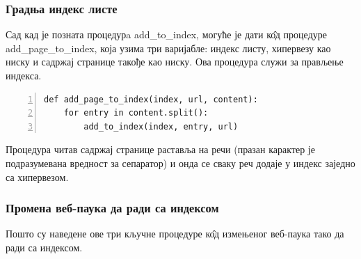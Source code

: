 		\subsubsection{Градња индекс листе}
		Сад кад је позната процедурa add\_to\_index, могуће је дати к\^{о}д процедуре add\_page\_to\_index, која узима три варијабле: индекс листу, хипервезу као ниску и садржај странице такође као ниску. Ова процедура служи за прављење индекса. 
		\begin{lstlisting}[caption=Процедура add\_page\_to\_index , label={lst:addpagetoindex}, numbers=left]
def add_page_to_index(index, url, content):
    for entry in content.split():
        add_to_index(index, entry, url)
		\end{lstlisting}
		Процедура читав садржај странице раставља на речи (празан карактер је подразумевана вредност за сепаратор) и онда се сваку реч додаје у индекс заједно са хипервезом. 
		\subsubsection{Промена веб-паука да ради са индексом}
		Пошто су наведене ове три кључне процедуре к\^{о}д измењеног веб-паука тако да ради са индексом. 
		
